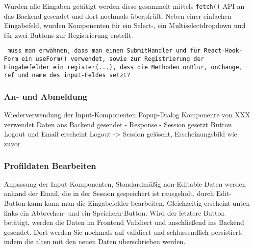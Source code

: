 \documentclass[conference,a4paper,flushend]{cs-techrep}
\begin{document}
Wurden alle Eingaben getätigt werden diese gesammelt mittels \texttt{fetch()} API an das Backend gesendet und dort nochmals überpfrüft.
Neben einer einfachen Eingabefeld, wurden Komponenten für ein Select-, ein Multiselectdropdown und für zwei Buttons zur Registrierung erstellt. 

\texttt{
muss man erwähnen, dass man einen SubmitHandler und für React-Hook-Form ein useForm() verwendet, sowie zur Registrierung der Eingabefelder ein register(...), dass die Methoden onBlur, onChange, ref und name des input-Feldes setzt?
}


\subsubsection{An- und Abmeldung\\}
Wiederverwendung der Input-Komponenten
Popup-Dialog Komponente von XXX verwendet
Daten ans Backend gesendet - Response - Session gesetzt 
Button Logout und Email erscheint 
Logout -> Session gelöscht, Erscheinungsbild wie zuvor

\subsubsection{Profildaten Bearbeiten\\}
Anpassung der Input-Komponenten, Standardmäßig non-Editable
Daten werden anhand der Email, die in der Session gespeichert ist rausgeholt.
durch Edit-Button kann kann man die Eingabefelder bearbeiten. Gleichzeitig erscheint unten links ein Abbrechen- und ein Speichern-Button. Wird der letztere Button betätigt, werden die Daten im Frontend Validiert und anschließend ins Backend gesendet. Dort werden Sie nochmals auf validiert und schlussendlich persistiert, indem die alten mit den neuen Daten überschrieben werden.
\end{document}
